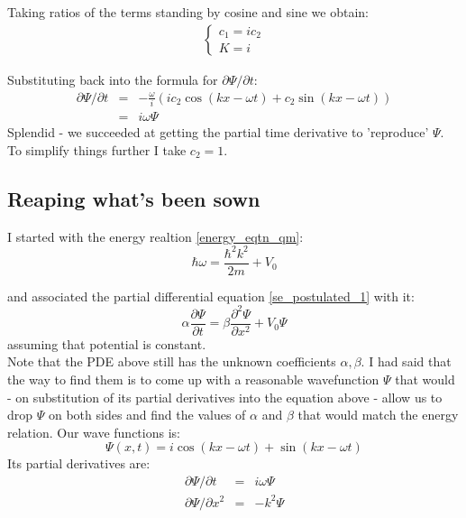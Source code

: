\documentclass[12pt]{article}
\begin{document}
Taking ratios of the terms standing by cosine and sine we obtain:
\begin{eqnarray*}
\begin{cases}
c_1 = i c_2 \\ 
K = i
\end{cases}
\end{eqnarray*}

Substituting back into the formula for $\partial \Psi / \partial t$:
\begin{eqnarray*}
\nonumber
\partial \Psi / \partial t &=& - \frac{\omega}{i} \left(
i c_2 \cos(kx - \omega t) + c_2 \sin(kx - \omega t) 
\right) \\
\nonumber 
&=& i \omega \Psi
\end{eqnarray*}
Splendid - we succeeded at getting the partial time derivative to 'reproduce' $\Psi$. To simplify 
things further I take $c_2 = 1$. 
\subsection{Reaping what's been sown}
I started with the energy realtion \eqref{energy_eqtn_qm}:
\begin{equation*}
\hbar \omega = \frac{\hbar^2 k^2}{2m} + V_0
\end{equation*}

and associated the partial differential equation \eqref{se_postulated_1} with it:
\begin{equation*}
\alpha \frac{\partial \Psi}{\partial t} = 
\beta \frac{\partial^2 \Psi}{\partial x^2} + V_0 \Psi
\end{equation*}
assuming that potential is constant.
\\ \indent Note that the PDE above still has the unknown coefficients $\alpha, \beta$. 
I had said that the way to find them is to come up with a reasonable
wavefunction $\Psi$ that would - on substitution of its partial derivatives into the equation above - allow us to drop $\Psi$ on both sides and find the values of $\alpha$ and $\beta$ that would match the energy relation. Our wave functions is:
\begin{equation}
\Psi (x, t) = 
i \cos (kx - \omega t) + \sin (kx - \omega t)
\end{equation}
Its partial derivatives are:
\begin{eqnarray*}
\partial \Psi / \partial t &=& i \omega \Psi \\
\partial \Psi / \partial x^2 &=& -k^2 \Psi
\end{eqnarray*}
\end{document}
